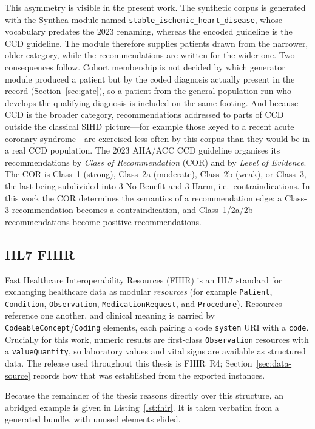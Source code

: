 This asymmetry is visible in the present work. The synthetic corpus is generated with the
Synthea module named \texttt{stable\_ischemic\_heart\_disease}, whose vocabulary predates the
2023 renaming, whereas the encoded guideline is the CCD guideline. The module therefore
supplies patients drawn from the narrower, older category, while the recommendations are
written for the wider one. Two consequences follow. Cohort membership is not decided by which
generator module produced a patient but by the coded diagnosis actually present in the record
(Section~\ref{sec:gate}), so a patient from the general-population run who develops the
qualifying diagnosis is included on the same footing. And because CCD is the broader
category, recommendations addressed to parts of CCD outside the classical SIHD picture---for
example those keyed to a recent acute coronary syndrome---are exercised less often by this
corpus than they would be in a real CCD population.
The 2023 AHA/ACC CCD
guideline \cite{virani2023} organises its recommendations by \emph{Class of Recommendation}
(COR) and by \emph{Level of Evidence}. The COR is Class~1 (strong), Class~2a (moderate),
Class~2b (weak), or Class~3, the last being subdivided into 3-No-Benefit and 3-Harm,
i.e.\ contraindications. In this
work the COR determines the semantics of a recommendation edge: a Class-3 recommendation
becomes a contraindication, and Class~1/2a/2b recommendations become positive
recommendations.

\subsection{HL7 FHIR}
Fast Healthcare Interoperability Resources (FHIR) \cite{fhir_r4} is an HL7 standard for
exchanging healthcare data as modular \emph{resources} (for example \texttt{Patient},
\texttt{Condition}, \texttt{Observation}, \texttt{MedicationRequest}, and
\texttt{Procedure}). Resources reference one another, and clinical meaning is carried by
\texttt{CodeableConcept}/\texttt{Coding} elements, each pairing a code \texttt{system} URI
with a \texttt{code}. Crucially for this work, numeric results are first-class
\texttt{Observation} resources with a \texttt{valueQuantity}, so laboratory values and vital
signs are available as structured data. The release used throughout this thesis is FHIR~R4;
Section~\ref{sec:data-source} records how that was established from the exported instances.

Because the remainder of the thesis reasons directly over this structure, an abridged
example is given in Listing~\ref{lst:fhir}. It is taken verbatim from a generated bundle,
with unused elements elided.

